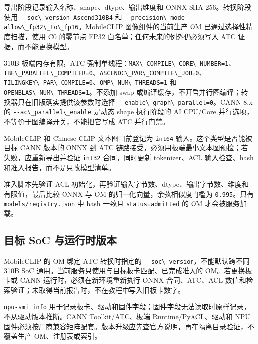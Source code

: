 导出阶段记录输入名称、shape、dtype、输出维度和 ONNX
SHA-256。转换阶段使用
\passthrough{\lstinline!--soc\_version Ascend310B4!} 和
\passthrough{\lstinline!--precision\_mode allow\_fp32\_to\_fp16!}。MobileCLIP
图像组件的当前生产 OM 已通过选择性精度扫描，使用 C0 的零节点 FP32
白名单；任何未来的例外仍必须写入 ATC 证据，而不能更换模型。

310B 板端内存有限，ATC
强制单线程：\passthrough{\lstinline!MAX\_COMPILE\_CORE\_NUMBER=1!}、\passthrough{\lstinline!TBE\_PARALLEL\_COMPILER=0!}、\passthrough{\lstinline!ASCENDC\_PAR\_COMPILE\_JOB=0!}、\passthrough{\lstinline!TILINGKEY\_PAR\_COMPILE=0!}、\passthrough{\lstinline!OMP\_NUM\_THREADS=1!}
和 \passthrough{\lstinline!OPENBLAS\_NUM\_THREADS=1!}。不添加 swap
或编译缓存，不开启并行图编译；转换器只在旧版确实提供该参数时选择
\passthrough{\lstinline!--enable\_graph\_parallel=0!}。CANN 8.x 的
\passthrough{\lstinline!--ac\_parallel\_enable!} 是动态 shape 执行阶段的
AI CPU/Core 并行选项，不等价于图编译开关，不能把它写成 ATC 并行门禁。

MobileCLIP 和 Chinese-CLIP 文本图目前登记为
\passthrough{\lstinline!int64!} 输入。这个类型是否能被目标 CANN 版本的
ONNX 到 ATC 链路接受，必须用板端最小文本图预检；若失败，应重新导出并验证
\passthrough{\lstinline!int32!} 合同，同时更新 tokenizer、ACL
输入检查、hash 和准入报告，而不是只改模型清单。

准入脚本先验证 ACL
初始化，再验证输入字节数、dtype、输出字节数、维度和有限值，最后比较 ONNX
与 OM 的归一化向量，余弦相似度门槛为
\passthrough{\lstinline!0.995!}。只有
\passthrough{\lstinline!models/registry.json!} 中 hash 一致且
\passthrough{\lstinline!status=admitted!} 的 OM 才会被服务加载。

\subsection{目标 SoC
与运行时版本}\label{ux76eeux6807-soc-ux4e0eux8fd0ux884cux65f6ux7248ux672c}

MobileCLIP 的 OM 绑定 ATC 转换时指定的
\passthrough{\lstinline!--soc\_version!}，不能默认跨不同 310B SoC
通用。当前服务只使用与目标板卡匹配、已完成准入的 OM。若更换板卡或 CANN
运行时，必须在新环境重新执行 ONNX 合同、ATC、ACL
数值和检索验证；未取得当前报告时，不在教程中写入旧板卡数字。

\passthrough{\lstinline!npu-smi info!}
用于记录板卡、驱动和固件字段；固件字段无法读取时原样记录，不从驱动版本推断。CANN
Toolkit/ATC、板端 Runtime/PyACL、驱动和 NPU
固件必须按厂商兼容矩阵配套。版本升级应先查官方说明，再在隔离目录验证，不覆盖生产
OM、注册表或索引。

